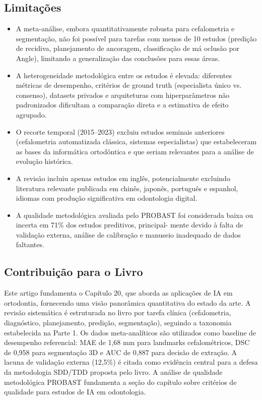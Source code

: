 \subsection{Limitações}
\begin{itemize}
  \item A meta-análise, embora quantitativamente robusta para
        cefalometria e segmentação, não foi possível para tarefas
        com menos de 10 estudos (predição de recidiva, planejamento
        de ancoragem, classificação de má oclusão por Angle),
        limitando a generalização das conclusões para essas áreas.
  \item A heterogeneidade metodológica entre os estudos é elevada:
        diferentes métricas de desempenho, critérios de ground truth
        (especialista único vs. consenso), datasets privados e
        arquiteturas com hiperparâmetros não padronizados dificultam
        a comparação direta e a estimativa de efeito agrupado.
  \item O recorte temporal (2015--2023) excluiu estudos seminais
        anteriores (cefalometria automatizada clássica, sistemas
        especialistas) que estabeleceram as bases da informática
        ortodôntica e que seriam relevantes para a análise de
        evolução histórica.
  \item A revisão incluiu apenas estudos em inglês, potencialmente
        excluindo literatura relevante publicada em chinês, japonês,
        português e espanhol, idiomas com produção significativa em
        odontologia digital.
  \item A qualidade metodológica avaliada pelo PROBAST foi considerada
        baixa ou incerta em 71\% dos estudos preditivos, principal-
        mente devido à falta de validação externa, análise de
        calibração e manuseio inadequado de dados faltantes.
\end{itemize}

\subsection{Contribuição para o Livro}
Este artigo fundamenta o Capítulo 20, que aborda as aplicações de IA
em ortodontia, fornecendo uma visão panorâmica quantitativa do estado
da arte. A revisão sistemática é estruturada no livro por tarefa
clínica (cefalometria, diagnóstico, planejamento, predição,
segmentação), seguindo a taxonomia estabelecida na Parte 1. Os dados
meta-analíticos são utilizados como baseline de desempenho referencial:
MAE de 1,68 mm para landmarks cefalométricos, DSC de 0,958 para
segmentação 3D e AUC de 0,887 para decisão de extração. A lacuna de
validação externa (12,5\%) é citada como evidência central para a
defesa da metodologia SDD/TDD proposta pelo livro. A análise de
qualidade metodológica PROBAST fundamenta a seção do capítulo sobre
critérios de qualidade para estudos de IA em odontologia.

